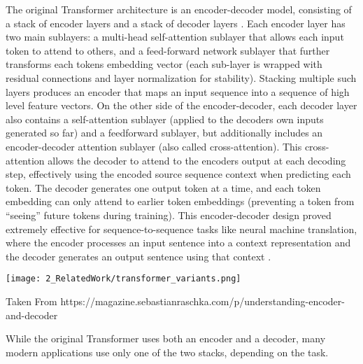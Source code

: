 The original Transformer architecture is an encoder-decoder model, 
consisting of a stack of encoder layers and a stack of decoder layers
\cite{attention}. 
Each encoder layer has two main sublayers: 
a multi-head self-attention sublayer that allows each input token to attend to others, 
and a feed-forward network sublayer that further transforms each tokens embedding vector 
(each sub-layer is wrapped with residual connections and layer normalization for stability). 
Stacking multiple such layers produces an encoder that maps an input sequence into a sequence of 
high level feature vectors.
On the other side of the encoder-decoder, each decoder layer also contains 
a self-attention sublayer (applied to the decoders own inputs generated so far) and 
a feedforward sublayer, 
but additionally includes an encoder-decoder attention sublayer (also called cross-attention). 
This cross-attention allows the decoder to attend to the encoders output at each decoding step, 
effectively using the encoded source sequence context when predicting each token. 
The decoder generates one output token at a time, 
and each token embedding can only attend to earlier 
token embeddings (preventing a token from “seeing” future tokens during training). 
This encoder-decoder design proved extremely effective for sequence-to-sequence tasks like 
neural machine translation, 
where the encoder processes an input sentence into a context representation and 
the decoder generates an output sentence using that context \cite{deep_translate, gtrans}.


\begin{marginfigure}[] %
    \texttt{[image: 2\_RelatedWork/transformer\_variants.png]}
    \caption{\label{fig:malratios}
    Taken From https://magazine.sebastianraschka.com/p/understanding-encoder-and-decoder}
\end{marginfigure}

While the original Transformer uses both an encoder and a decoder, 
many modern applications use only one of the two stacks, depending on the task. 


